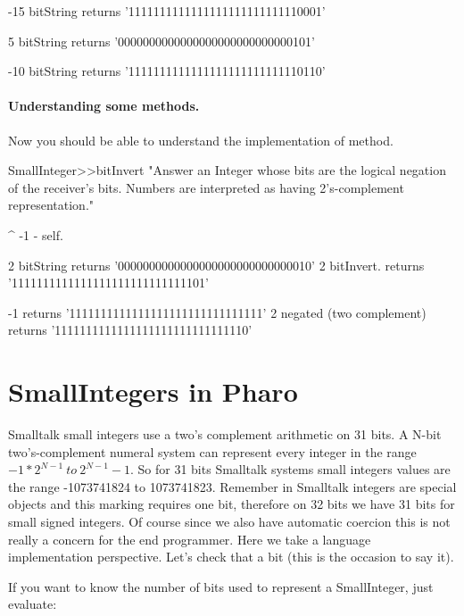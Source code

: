 \documentclass[a4paper,10pt,twoside]{book}
\begin{document}
\begin{code}
-15 bitString 
	returns '1111111111111111111111111110001'

5 bitString 
	returns '0000000000000000000000000000101'
	
-10 bitString 
	returns '1111111111111111111111111110110'
\end{code}



\paragraph{Understanding some methods.}
Now you should be able to understand the implementation of  method.

\begin{code}{}
SmallInteger>>bitInvert
    "Answer an Integer whose bits are the logical negation of the receiver's bits.
    Numbers are interpreted as having 2's-complement representation."

	^ -1 - self.
\end{code}

\begin{code}{}
2 bitString
	returns '0000000000000000000000000000010'
2 bitInvert.
	returns '1111111111111111111111111111101'
	
-1 
	returns '1111111111111111111111111111111'
2 negated (two complement)
	returns '1111111111111111111111111111110'
\end{code}


\section{SmallIntegers in Pharo}

Smalltalk small integers use a two's complement arithmetic on 31 bits.  A N-bit two's-complement numeral system can represent every integer in the range $-1 * 2^{N-1}\ to\ 2^{N-1}-1$. So for 31 bits Smalltalk systems small integers values are the range -1073741824 to  1073741823.  Remember in Smalltalk integers are special objects and this marking requires one bit, therefore on 32 bits we have 31 bits for small signed integers. Of course since we also have automatic coercion this is not really a concern for the end programmer. Here we take a language implementation perspective.
 Let's check that a bit (this is the occasion to say it). 

If you want to know the number of bits used to represent a
SmallInteger, just evaluate:
\end{document}
